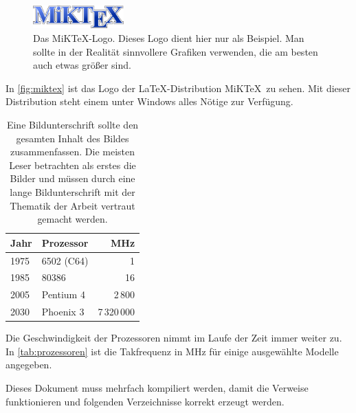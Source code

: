 \documentclass{scrartcl}
\begin{document}
  \begin{figure}
    \centering
    \includegraphics[width=3.5cm]{miktex}
    \caption{Das MiK\TeX-Logo. Dieses Logo dient hier nur als
      Beispiel. Man sollte in der Realität sinnvollere Grafiken
      verwenden, die am besten auch etwas größer sind.}
    \label{fig:miktex}
  \end{figure}

  In \autoref{fig:miktex} ist das Logo der \LaTeX-Distribution
  MiK\TeX\ zu sehen. Mit dieser Distribution steht einem unter
  Windows alles Nötige zur Verfügung.

  \begin{table}
    \centering
    \begin{tabular}{l|lr}
      \textbf{Jahr} & \textbf{Prozessor} &
          \textbf{MHz} \\
      \hline
      1975 & 6502 (C64) & 1 \\
      1985 & 80386 & 16 \\
      2005 & Pentium 4 & 2\,800 \\
      2030 & Phoenix 3 & 7\,320\,000
    \end{tabular}
    \caption{Eine Bildunterschrift sollte den gesamten Inhalt des
      Bildes zusammenfassen. Die meisten Leser betrachten als erstes
      die Bilder und müssen durch eine lange Bildunterschrift mit der
      Thematik der Arbeit vertraut gemacht werden.}
    \label{tab:prozessoren}
  \end{table}

  Die Geschwindigkeit der Prozessoren nimmt im Laufe der Zeit immer
  weiter zu. In \autoref{tab:prozessoren} ist die Takfrequenz in MHz
  für einige ausgewählte Modelle angegeben.

  Dieses Dokument muss mehrfach kompiliert werden, damit die Verweise
  funktionieren und folgenden Verzeichnisse korrekt erzeugt werden.

  \listoffigures
  \listoftables
\end{document}

